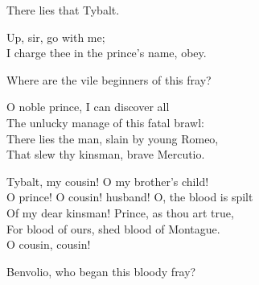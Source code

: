 \begin{speech}
There lies that Tybalt. \\
\end{speech}
\begin{speech}
Up, sir, go with me; \\
I charge thee in the prince's name, obey. 
\\
\end{speech}
\begin{speech}
Where are the vile beginners of this fray? \\
\end{speech}
\begin{speech}
O noble prince, I can discover all \\
The unlucky manage of this fatal brawl: \\
There lies the man, slain by young Romeo, \\
That slew thy kinsman, brave Mercutio. \\
\end{speech}
\begin{speech}
Tybalt, my cousin!  O my brother's child! \\
O prince! O cousin! husband! O, the blood is spilt \\
Of my dear kinsman!  Prince, as thou art true, \\
For blood of ours, shed blood of Montague. \\
O cousin, cousin! \\
\end{speech}
\begin{speech}
Benvolio, who began this bloody fray? \\
\end{speech}
